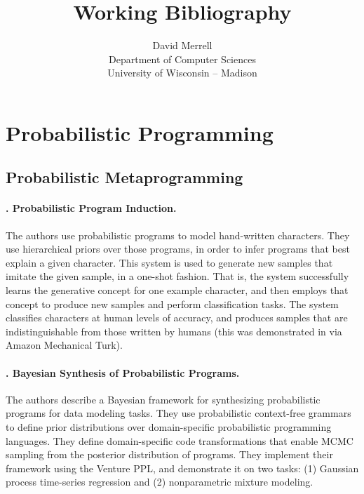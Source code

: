 \documentclass[14pt]{article}
\date{}
\begin{document}
\title{Working Bibliography}

\author{David Merrell \\ Department of Computer Sciences \\ University of Wisconsin -- Madison}

\maketitle{}

\thispagestyle{empty}

\section{Probabilistic Programming}

\subsection{Probabilistic Metaprogramming}

\paragraph{\citet{lake-bpl-2015}. Probabilistic Program Induction.}
The authors use probabilistic programs to model hand-written characters.
They use hierarchical priors over those programs, in order to infer programs that best explain a given character.
This system is used to generate new samples that imitate the given sample, in a one-shot fashion.
That is, the system successfully learns the generative concept for one example character, and then employs that concept to produce new samples and perform classification tasks.
The system classifies characters at human levels of accuracy, and produces samples that are indistinguishable from those written by humans (this was demonstrated in via Amazon Mechanical Turk). 

\paragraph{\citet{saad-synthesis-2019}. Bayesian Synthesis of Probabilistic Programs.}
The authors describe a Bayesian framework for synthesizing probabilistic programs for data modeling tasks.
They use probabilistic context-free grammars to define prior distributions over domain-specific probabilistic programming languages.
They define domain-specific code transformations that enable MCMC sampling from the posterior distribution of programs.
They implement their framework using the Venture PPL, and demonstrate it on two tasks: (1) Gaussian process time-series regression and (2) nonparametric mixture modeling. 
\end{document}

